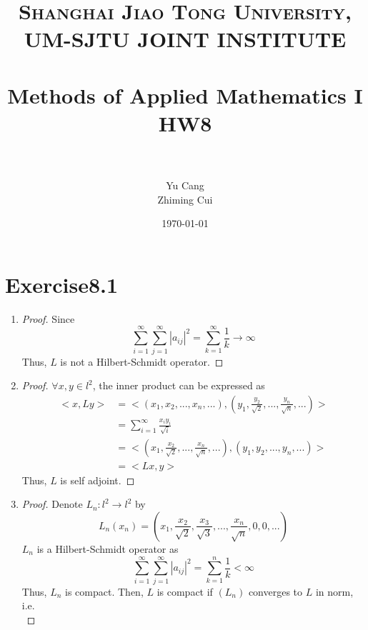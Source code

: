 \documentclass[paper=a4, fontsize=11pt]{scrartcl} %
\title{	
\normalfont \normalsize 
\textsc{Shanghai Jiao Tong University, UM-SJTU JOINT INSTITUTE} \\ [25pt] %
\horrule{0.5pt} \\[0.4cm] %
\huge Methods of Applied Mathematics I\\ HW8 \\ %
\horrule{2pt} \\[0.5cm] %
}
\author{Yu Cang \quad 018370210001\\ Zhiming Cui \quad 017370910006} %
\date{\normalsize \today} %
\numberwithin{equation}{section} %
\numberwithin{figure}{section} %
\numberwithin{table}{section} %
\begin{document}
\maketitle %

\section{Exercise8.1}
	\begin{enumerate}
		\item 
			\begin{proof}
				Since
				\begin{equation}
					\sum_{i=1}^{\infty}\sum_{j=1}^{\infty}|a_{ij}|^2 = \sum_{k=1}^{\infty} \frac{1}{k} \rightarrow \infty
				\end{equation}
				Thus, $L$ is not a Hilbert-Schmidt operator.
			\end{proof}
		\item 
			\begin{proof}
				$\forall x, y \in l^2$, the inner product can be expressed as
				\begin{equation}
					\begin{aligned}
						<x, Ly> & =  <(x_1, x_2, ... , x_n, ...), (y_1, \frac{y_2}{\sqrt{2}}, ... , \frac{y_n}{\sqrt{n}}, ...)>\\
								& = \sum_{i=1}^{\infty} \frac{x_i y_i}{\sqrt{i}}\\
								& = <(x_1, \frac{x_2}{\sqrt{2}}, ... , \frac{x_n}{\sqrt{n}}, ...), (y_1, y_2, ... , y_n, ...)>\\
								& = <Lx, y>
					\end{aligned}
				\end{equation}
				Thus, $L$ is self adjoint.
			\end{proof}
		\item 
			\begin{proof}
				Denote $L_n : l^2 \rightarrow l^2$ by
				\begin{equation}
					L_n(x_n) = (x_1, \frac{x_2}{\sqrt{2}}, \frac{x_3}{\sqrt{3}}, ... , \frac{x_n}{\sqrt{n}}, 0, 0, ...)
				\end{equation}
				$L_n$ is a Hilbert-Schmidt operator as 
				\begin{equation}
					\sum_{i=1}^{\infty}\sum_{j=1}^{\infty}|a_{ij}|^2 = \sum_{k=1}^{n} \frac{1}{k} < \infty
				\end{equation}
				Thus, $L_n$ is compact. Then, $L$ is compact if $(L_n)$ converges to $L$ in norm, i.e.
				\begin{equation}

\end{equation}
\end{proof}
\end{enumerate}
\end{document}
